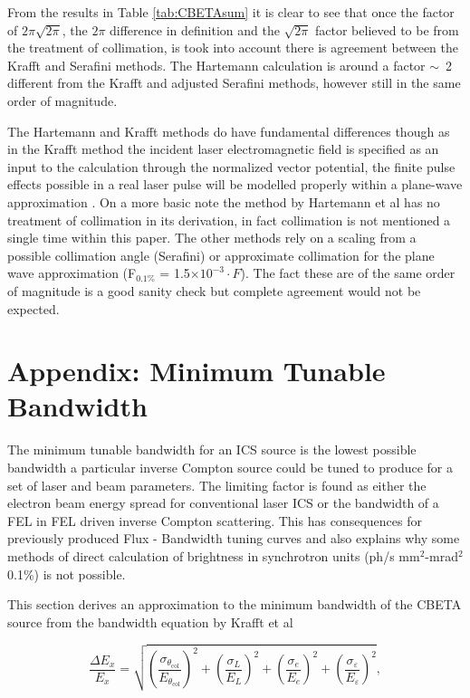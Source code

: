 \documentclass[10pt]{article}
\begin{document}
From the results in Table \ref{tab:CBETAsum} it is clear to see that once the factor of $2\pi\sqrt{2\pi}$, the $2\pi$ difference in definition and the $\sqrt{2\pi}$ factor believed to be from the treatment of collimation, is took into account there is agreement between the Krafft and Serafini methods. The Hartemann calculation is around a factor $\sim$~2 different from the Krafft and adjusted Serafini methods, however still in the same order of magnitude.

The Hartemann and Krafft methods do have fundamental differences though as in the Krafft method the incident laser electromagnetic
field is specified as an input to the calculation through
the normalized vector potential, the finite pulse
effects possible in a real laser pulse will be modelled
properly within a plane-wave approximation \cite{krafft2016laser}. On a more basic note the method by Hartemann et al \cite{hartemann2005high} has no treatment of collimation in its derivation, in fact collimation is not mentioned a single time within this paper. The other methods rely on a scaling from a possible collimation angle (Serafini) or approximate collimation for the plane wave approximation (F$_{0.1\%}$ = 1.5$\times 10^{-3}\cdot F$). The fact these are of the same order of magnitude is a good sanity check but complete agreement would not be expected.     

\section*{Appendix: Minimum Tunable Bandwidth}
\label{sec:MTB}

The minimum tunable bandwidth for an ICS source is the lowest possible bandwidth a particular inverse Compton source could be tuned to produce for a set of laser and beam parameters. The limiting factor is found as either the electron beam energy spread for conventional laser ICS or the bandwidth of a FEL in FEL driven inverse Compton scattering. This has consequences for previously produced Flux - Bandwidth tuning curves and also explains why some methods of direct calculation of brightness in synchrotron units (ph/s mm$^{2}$-mrad$^{2}$ 0.1\%) is not possible.

This section derives an approximation to the minimum bandwidth of the CBETA source from the bandwidth equation by Krafft et al \cite{ranjan2018simulation}

\begin{equation}
\frac{\Delta E_{x}}{E_{x}} = \sqrt{\left(\frac{\sigma_{\theta_{\mathrm{col}}}}{E_{\theta_{\mathrm{col}}}}\right)^{2}+\left(\frac{\sigma_{L}}{E_{L}}\right)^{2}+\left(\frac{\sigma_{e}}{E_{e}}\right)^{2}+\left(\frac{\sigma_{\varepsilon}}{E_{\varepsilon}}\right)^{2}},
\label{eq:KrafftBand}
\end{equation}
\end{document}
